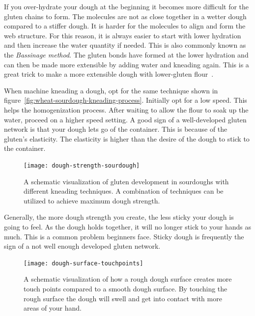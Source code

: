 If you over-hydrate your dough at the beginning it becomes more difficult
for the gluten chains to form. The molecules are not as close together in
a wetter dough compared to a stiffer dough. It is harder for the molecules
to align and form the web structure. For this reason, it is always easier
to start with lower hydration and then increase the water quantity if needed.
This is also commonly known as the \emph{Bassinage method}. The gluten
bonds have formed at the lower hydration and can then be made more extensible
by adding water and kneading again. This is a great trick to make
a more extensible dough with lower-gluten flour~\cite{bassinage+technique}.

When machine kneading a dough, opt for the same technique shown in
figure~\ref{fig:wheat-sourdough-kneading-process}.  Initially opt for a low
speed. This helps the homogenization process.
After waiting to allow the flour to soak up the water, proceed on a higher speed
setting. A good sign of a well-developed gluten network is
that your dough lets go of the container. This is because of the gluten's elasticity.
The elasticity is higher than the desire of the
dough to stick to the container.

\begin{figure}[!htb]
  \texttt{[image: dough-strength-sourdough]}
  \caption[Dough strength over time with kneading]{A schematic visualization
      of gluten development in sourdoughs with different kneading techniques.
      A combination of techniques can be utilized to achieve maximum dough
      strength.}%
  \label{fig:dough-strength-sourdough}
\end{figure}

Generally, the more dough strength you create, the less sticky your dough is going to
feel. As the dough holds together, it will no longer stick to your hands as
much. This is a common problem beginners face. Sticky dough is frequently
the sign of a not well enough developed gluten network.

\begin{figure}[!htb]
  \texttt{[image: dough-surface-touchpoints]}
  \caption[Touching the dough surface]{A schematic visualization of how a rough
      dough surface creates more touch points compared to a smooth dough
      surface.  By touching the rough surface the dough will swell and get into
      contact with more areas of your hand.}%
  \label{fig:dough-touch-points}
\end{figure}

